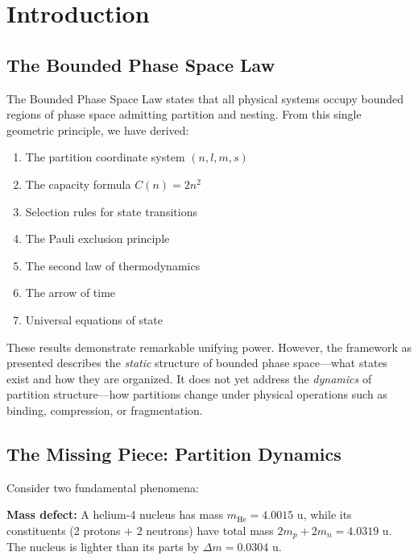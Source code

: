 \documentclass[twocolumn,10pt,a4paper]{article}
\theoremstyle{definition}
\theoremstyle{remark}
\begin{document}
\section{Introduction}
\label{sec:introduction}

\subsection{The Bounded Phase Space Law}

The Bounded Phase Space Law states that all physical systems occupy bounded regions of phase space admitting partition and nesting. From this single geometric principle, we have derived:

\begin{enumerate}[label=(\roman*)]
    \item The partition coordinate system $(n, l, m, s)$
    \item The capacity formula $C(n) = 2n^2$
    \item Selection rules for state transitions
    \item The Pauli exclusion principle
    \item The second law of thermodynamics
    \item The arrow of time
    \item Universal equations of state
\end{enumerate}

These results demonstrate remarkable unifying power. However, the framework as presented describes the \emph{static} structure of bounded phase space---what states exist and how they are organized. It does not yet address the \emph{dynamics} of partition structure---how partitions change under physical operations such as binding, compression, or fragmentation.

\subsection{The Missing Piece: Partition Dynamics}

Consider two fundamental phenomena:

\textbf{Mass defect:} A helium-4 nucleus has mass $m_{\text{He}} = 4.0015$ u, while its constituents (2 protons + 2 neutrons) have total mass $2m_p + 2m_n = 4.0319$ u. The nucleus is lighter than its parts by $\Delta m = 0.0304$ u.
\end{document}
